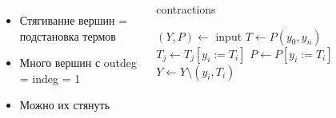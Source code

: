 \documentclass{beamer}
\begin{document}
\begin{frame}
\begin{columns}
\begin{itemize}
  \item Стягивание вершин = подстановка термов
  \item Много вершин с outdeg = indeg = 1
  \item Можно их стянуть
\end{itemize}
\begin{megaalgorithm}\tiny
  \caption{\tiny contractions}
\begin{algorithmic}
  \State $(Y, P)\gets$ input
  \State $T \gets P(y_0, y_n)$
      \If{\textcolor{red}{$indeg(y_i) = 1$ and $outdeg(y_i) = 1$}}
              \State $T_j \gets T_j [y_i := T_i]$
          \EndFor
          \State $P \gets P [y_i := T_i]$
          \State $Y \gets Y \setminus (y_i, T_i)$
      \EndIf
  \EndFor
  \State {}
\end{algorithmic}
\end{megaalgorithm}
\end{columns}
\end{frame}
\end{document}
